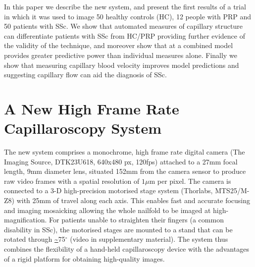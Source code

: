 \documentclass[runningheads,a4paper]{llncs}
\begin{document}
In this paper we describe the new system, and present the first results of a trial in which it was used to image 50 healthy controls (HC), 12 people with PRP and 50 patients with SSc. We show that automated measures of capillary structure can differentiate patients with SSc from HC/PRP providing further evidence of the validity of the technique, and moreover show that at a combined model provides greater predictive power than individual measures alone. Finally we show that measuring capillary blood velocity improves model predictions and suggesting capillary flow can aid the diagnosis of SSc.
%
\section{A New High Frame Rate Capillaroscopy System}
\label{s:new_system}
%
The new system comprises a monochrome, high frame rate digital camera (The Imaging Source, DTK23U618, 640x480 px, 120fps) attached to a  27mm focal length, 9mm diameter lens, situated 152mm from the camera sensor to produce raw video frames with a spatial resolution of $1{\mu}$m per pixel. The camera is connected to a 3-D high-precision motorised stage system (Thorlabs, MTS25/M-Z8) with 25mm of travel along each axis. This enables fast and accurate focusing and imaging mosaicking allowing the whole nailfold to be imaged at high-magnification. For patients unable to straighten their fingers (a common disability in SSc), the motorised stages are mounted to a stand that can be rotated through \url{~}75$^{\circ}$ (video in supplementary material). The system thus combines the flexibility of a hand-held capillaroscopy device with the advantages of a rigid platform for obtaining high-quality images. 
%
\end{document}
